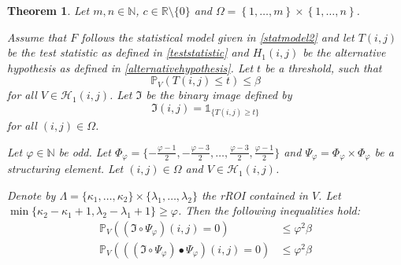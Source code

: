 \documentclass[a4paper,12pt]{article}
\theoremstyle{plain}
\newtheorem{theorem}{Theorem}[section]
\theoremstyle{definition}
\begin{document}
\begin{theorem}\label{thm: typeIIinequalities}
	Let $m, n \in \mathbb{N}$, $c \in \mathbb{R} \setminus \{ 0 \}$ and $\Omega = \left\{ 1, \dots, m \right\} \times \left\{ 1, \dots, n \right\}$.
	
	Assume that $F$ follows the statistical model given in \eqref{statmodel2} and let $T(i, j)$ be the test statistic as defined in \eqref{teststatistic} and $H_1(i, j)$ be the alternative hypothesis as defined in \eqref{alternativehypothesis}. Let $t$ be a threshold, such that
	\begin{equation*}
		\mathbb{P}_V\left( T(i, j) \leq t \right) \leq \beta
	\end{equation*}
	for all $V \in \mathcal{H}_1(i, j)$. Let $\mathfrak{I}$ be the binary image defined by
	\begin{equation}
		\mathfrak{I}(i, j) = \mathds{1}_{ \{ T(i, j) \geq t \} }
	\end{equation}
	for all $(i, j) \in \Omega$.
	
	Let $\varphi \in \mathbb{N}$ be odd. Let $\Phi_\varphi = \{ -\frac{\varphi - 1}{2}, -\frac{\varphi - 3}{2}, \dots, \frac{\varphi - 3}{2}, \frac{\varphi - 1}{2} \}$ and $\Psi_\varphi = \Phi_\varphi \times \Phi_\varphi$ be a structuring element. Let $(i, j) \in \Omega$ and $V \in \mathcal{H}_1(i, j)$.
	
	Denote by $\varLambda = \{ \kappa_1, \dots, \kappa_2 \} \times \{ \lambda_1, \dots, \lambda_2 \}$ the rROI contained in $V$. Let $\min \{ \kappa_2 - \kappa_1 + 1, \lambda_2 - \lambda_1 + 1 \} \geq \varphi$.
	Then the following inequalities hold:
	\begin{align}
		\mathbb{P}_V\left( (\mathfrak{I} \circ \Psi_\varphi)(i, j) = 0 \right) &\leq \varphi^2 \beta \label{ineq: typeIIopening} \\
		\mathbb{P}_V\left( ((\mathfrak{I} \circ \Psi_\varphi) \bullet \Psi_\varphi)(i, j) = 0 \right) &\leq \varphi^2 \beta \label{ineq: typeIIclosing}
	\end{align}
\end{theorem}
\end{document}
